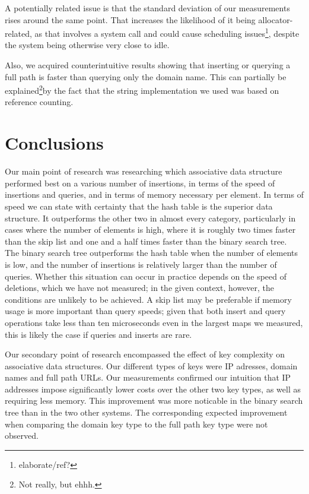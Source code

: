 \documentclass[12pt,a4paper]{article}
\begin{document}
    A potentially related issue is that the standard deviation of our measurements rises around the
    same point.  That increases the likelihood of it being allocator-related, as that involves a
    system call and could cause scheduling issues\footnote{elaborate/ref?}, despite the system being
    otherwise very close to idle.

    Also, we acquired counterintuitive results showing that inserting or querying a full path is
    faster than querying only the domain name.  This can partially be explained\footnote{Not really,
    but ehhh.}by the fact that the string implementation we used was based on reference counting.


    \section{Conclusions}
    Our main point of research was researching which associative data structure performed best on a
    various number of insertions, in terms of the speed of insertions and queries, and in terms of
    memory necessary per element.  In terms of speed we can state with certainty that the hash table
    is the superior data structure.  It outperforms the other two in almost every category,
    particularly in cases where the number of elements is high, where it is roughly two times faster
    than the skip list and one and a half times faster than the binary search tree.  The binary
    search tree outperforms the hash table when the number of elements is low, and the number of
    insertions is relatively larger than the number of queries.  Whether this situation can occur in
    practice depends on the speed of deletions, which we have not measured; in the given context,
    however, the conditions are unlikely to be achieved.  A skip list may be preferable if memory
    usage is more important than query speeds; given that both insert and query operations take less
    than ten microseconds even in the largest maps we measured, this is likely the case if queries
    and inserts are rare.

    Our secondary point of research encompassed the effect of key complexity on associative data
    structures.  Our different types of keys were IP adresses, domain names and full path URLs.  Our
    measurements confirmed our intuition that IP addresses impose significantly lower costs over the
    other two key types, as well as requiring less memory.  This improvement was more noticable in
    the binary search tree than in the two other systems.  The corresponding expected improvement
    when comparing the domain key type to the full path key type were not observed.
\end{document}
